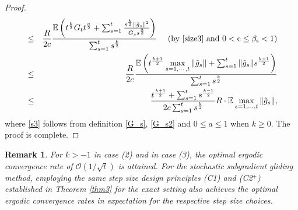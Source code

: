 \documentclass[sn-mathphys]{JORSC-jnl}%
\theoremstyle{thmstyleone}%
\newtheorem{remark}{Remark}[section]%
\theoremstyle{thmstylethree}%
\begin{document}
\begin{proof}
\begin{eqnarray}
		&\leq& \frac{R}{2c}\frac{\mathbb{E}\left(t^{\frac{k}{2}}G_t t^{\frac{a}{2}}+\sum_{s=1}^t\frac{s^{\frac{k}{2}}\Vert \tilde{g}_s \Vert^2}{G_s s^{\frac{a}{2}}}\right)}{\sum_{s=1}^t s^{\frac{k}{2}}} ~~~~({\rm by~ \eqref{size3}~ and ~0 < c \leq \beta_s <1})\nonumber \\
		&\leq& \frac{R}{2c}\frac{\mathbb{E}\left(t^{\frac{k+1}{2}}\max\limits_{s=1,\cdots,t}{\|\tilde{g}_s\|}+\sum_{s=1}^t\Vert \tilde{g}_s \Vert s^{\frac{k-1}{2}}\right)}{\sum_{s=1}^t s^{\frac{k}{2}}}\label{s3} \\
		&\leq&
		\frac{t^{\frac{k+1}{2}} +\sum_{s=1}^{t} s^{\frac{k-1}{2}}}{2c\sum_{s=1}^{t} s^{\frac{k}{2}}} R\cdot \mathbb{E}\max\limits_{s=1,\dots,t}{\|\tilde{g}_s\|}, \nonumber
	\end{eqnarray}
	where \eqref{s3} follows from definition \eqref{G_s}, \eqref{G_s2} and $0 \leq a \leq 1$ when $k \geq 0$. The proof is complete.
\end{proof}

\begin{remark}
	For $k > -1$ in case (2) and in case (3), the optimal ergodic convergence rate of $\mathcal{O}(1/\sqrt{t})$ is attained. For the stochastic subgradient gliding method, employing the same step size design principles (C1) and (C2$^+$) established in Theorem \ref{thm3} for the exact setting also achieves the optimal ergodic convergence rates in expectation for the respective step size choices.
\end{remark}
\end{document}
